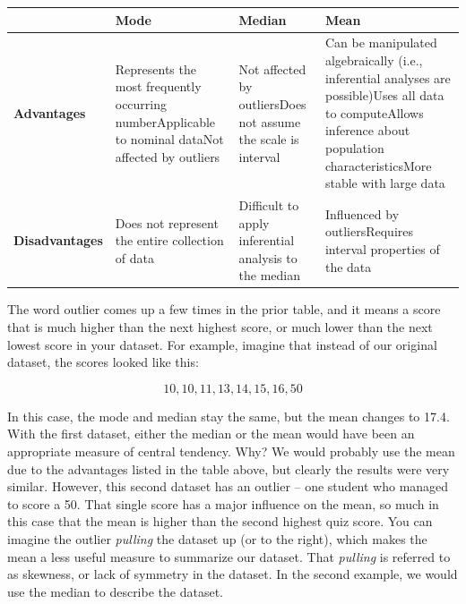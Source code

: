 \documentclass[
  letterpaper,
  DIV=11,
  numbers=noendperiod]{scrreprt}
\begin{document}
\begin{longtable}[]{@{}
  >{\raggedright\arraybackslash}p{}
  >{\raggedright\arraybackslash}p{}
  >{\raggedright\arraybackslash}p{}
  >{\raggedright\arraybackslash}p{}@{}}
\toprule\noalign{}
\begin{minipage}[b]{\linewidth}\raggedright
\end{minipage} & \begin{minipage}[b]{\linewidth}\raggedright
\textbf{Mode}
\end{minipage} & \begin{minipage}[b]{\linewidth}\raggedright
\textbf{Median}
\end{minipage} & \begin{minipage}[b]{\linewidth}\raggedright
\textbf{Mean}
\end{minipage} \\
\midrule\noalign{}
\endhead
\bottomrule\noalign{}
\endlastfoot
\textbf{Advantages} & Represents the most frequently occurring
numberApplicable to nominal dataNot affected by outliers & Not affected
by outliersDoes not assume the scale is interval & Can be manipulated
algebraically (i.e., inferential analyses are possible)Uses all data to
computeAllows inference about population characteristicsMore stable with
large data \\
\textbf{Disadvantages} & Does not represent the entire collection of
data & Difficult to apply inferential analysis to the median &
Influenced by outliersRequires interval properties of the data \\
\end{longtable}

The word outlier comes up a few times in the prior table, and it means a
score that is much higher than the next highest score, or much lower
than the next lowest score in your dataset. For example, imagine that
instead of our original dataset, the scores looked like this:

\[
10, 10, 11, 13, 14, 15, 16, 50 
\]

In this case, the mode and median stay the same, but the mean changes to
17.4. With the first dataset, either the median or the mean would have
been an appropriate measure of central tendency. Why? We would probably
use the mean due to the advantages listed in the table above, but
clearly the results were very similar. However, this second dataset has
an outlier -- one student who managed to score a 50. That single score
has a major influence on the mean, so much in this case that the mean is
higher than the second highest quiz score. You can imagine the outlier
\emph{pulling} the dataset up (or to the right), which makes the mean a
less useful measure to summarize our dataset. That \emph{pulling} is
referred to as skewness, or lack of symmetry in the dataset. In the
second example, we would use the median to describe the dataset.
\end{document}
